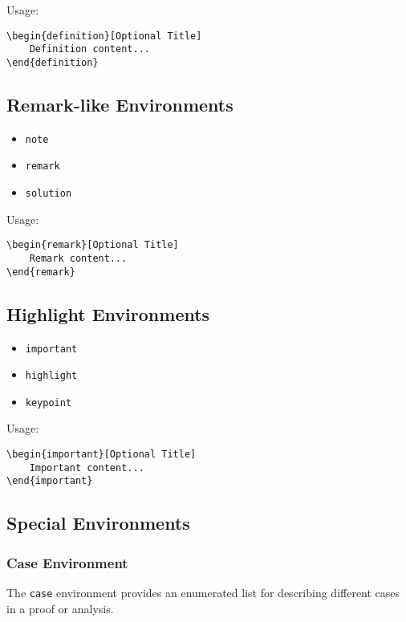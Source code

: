 \documentclass{ltxdoc}
\newcommand{\env}[1]{\texttt{#1}}
\begin{document}
Usage:
\begin{verbatim}
\begin{definition}[Optional Title]
    Definition content...
\end{definition}
\end{verbatim}

\subsection{Remark-like Environments}

\begin{itemize}
	\item \env{note}
	\item \env{remark}
	\item \env{solution}
\end{itemize}

Usage:
\begin{verbatim}
\begin{remark}[Optional Title]
    Remark content...
\end{remark}
\end{verbatim}

\subsection{Highlight Environments}

\begin{itemize}
	\item \env{important}
	\item \env{highlight}
	\item \env{keypoint}
\end{itemize}

Usage:
\begin{verbatim}
\begin{important}[Optional Title]
    Important content...
\end{important}
\end{verbatim}

\subsection{Special Environments}

\subsubsection{Case Environment}

The \env{case} environment provides an enumerated list for describing different cases in a proof or analysis.
\end{document}
